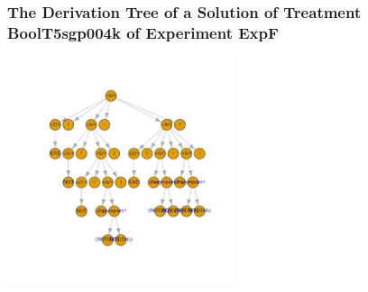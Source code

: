  \begin{frame}
 \frametitle{ The Derivation Tree of a Solution of Treatment BoolT5sgp004k of Experiment ExpF }
 \begin{center}
\includegraphics[width=0.5\textwidth, angle=0]
{ExpFDerivationTreeFigure002.pdf}
 \end{center}
 \label{templateReport/ExpFDerivationTreeFigure002.pdf}  
 \end{frame}

